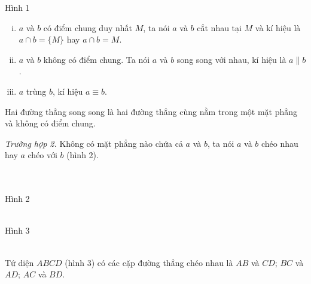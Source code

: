 \begin{center}
Hình 1
\end{center}
\begin{enumerate}[i)]
\item $a$ và $b$ có điểm chung duy nhất $M$, ta nói $a$ và $b$ cắt nhau tại $M$ và kí hiệu là $a\cap b=\{M\}$ hay $a\cap b=M$.
\item $a$ và $b$ không có điểm chung. Ta nói $a$ và $b$ song song với nhau, kí hiệu là $a\parallel b$.
\item $a$ trùng $b$, kí hiệu $a\equiv b$.
\end{enumerate}
\begin{note}
Hai đường thẳng song song là hai đường thẳng cùng nằm trong một mặt phẳng và không có điểm chung.
\end{note}
\textit{Trường hợp 2.} Không có mặt phẳng nào chứa cả $a$ và $b$, ta nói $a$ và $b$ chéo nhau hay $a$ chéo với $b$ (hình 2).\\
\begin{minipage}{0.5\textwidth}
\begin{center}
\\
\text{}\\
Hình 2
\end{center}
\end{minipage}
\begin{minipage}{0.5\textwidth}
\begin{center}
\\
Hình 3
\end{center}
\end{minipage}\\
Tứ diện $ABCD$ (hình 3) có các cặp đường thẳng chéo nhau là $AB$ và $CD$; $BC$ và $AD$; $AC$ và $BD$.
